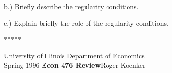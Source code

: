 \begin{enumerate}
b.) Briefly describe the regularity conditions.

c.) Explain briefly the role of the regularity conditions.

%
%
%
%
%
%
%
%
%
%
%
%
%
%

%

\end{enumerate}



\vspace{10mm} 
\begin{center} 
***** 
\end{center} 

\noindent
University of Illinois \hfill Department of Economics \\
Spring 1996 \hfill \large{{\bf Econ 476 Review}}\hfill Roger Koenker


